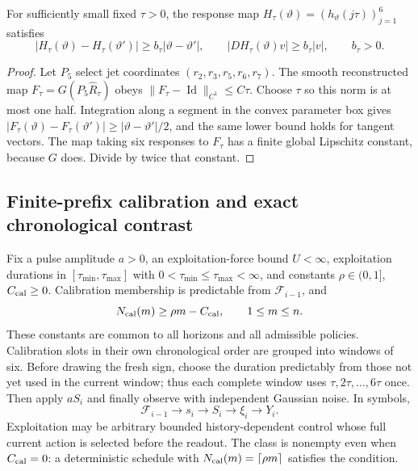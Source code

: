 \begin{theorem}
\label{thm:jet-embedding}
For sufficiently small fixed \(\tau>0\), the response map
\(H_\tau(\vartheta)=(h_\vartheta(j\tau))_{j=1}^6\) satisfies
\begin{equation}
 |H_\tau(\vartheta)-H_\tau(\vartheta')|\ge b_\tau|\vartheta-\vartheta'|,
 \qquad |DH_\tau(\vartheta)v|\ge b_\tau|v|,
 \qquad b_\tau>0.
 \label{eq:six-bi-lipschitz}
\end{equation}
\end{theorem}
\begin{proof}
Let \(P_5\) select jet coordinates \((r_2,r_3,r_5,r_6,r_7)\).
The smooth reconstructed map \(F_\tau=G(P_5\widehat R_\tau)\) obeys
\(\|F_\tau-\operatorname{Id}\|_{C^1}\le C\tau\).
Choose \(\tau\) so this norm is at most one half. Integration along a
segment in the convex parameter box gives
\(|F_\tau(\vartheta)-F_\tau(\vartheta')|\ge|
\vartheta-\vartheta'|/2\), and the same lower bound holds for tangent
vectors. The map taking six responses to \(F_\tau\) has a finite global
Lipschitz constant, because \(G\) does. Divide by twice that constant.
\end{proof}

\subsection{Finite-prefix calibration and exact chronological contrast}
\label{sec:balanced-design}
Fix a pulse amplitude \(a>0\), an exploitation-force bound \(U<\infty\),
exploitation durations in \([\tau_{\min},\tau_{\max}]\) with
\(0<\tau_{\min}\le\tau_{\max}<\infty\), and constants
\(\rho\in(0,1]\), \(C_{\rm cal}\ge0\). Calibration membership is
predictable from \(\mathcal F_{i-1}\), and
\begin{equation}
 N_{\rm cal}(m)\ge\rho m-C_{\rm cal},\qquad 1\le m\le n.
 \label{eq:prefix-calibration}
\end{equation}
These constants are common to all horizons and all admissible policies.
Calibration slots in their own chronological order are grouped into windows
of six. Before drawing the fresh sign, choose the duration predictably from
those not yet used in the current window; thus each complete window uses
\(\tau,2\tau,\ldots,6\tau\) once. Then apply \(aS_i\) and finally observe
with independent Gaussian noise. In symbols,
\[
 \mathcal F_{i-1}\longrightarrow s_i\longrightarrow S_i
 \longrightarrow\xi_i\longrightarrow Y_i.
\]
Exploitation may be arbitrary bounded history-dependent control whose full
current action is selected before the readout. The class is nonempty even
when \(C_{\rm cal}=0\): a deterministic schedule with
\(N_{\rm cal}(m)=\lceil\rho m\rceil\) satisfies the condition.

